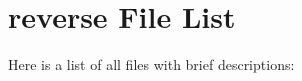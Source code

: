 \section{reverse File List}
Here is a list of all files with brief descriptions:\begin{CompactList}
\item{}
\end{CompactList}
